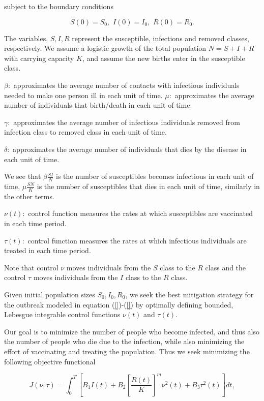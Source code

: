 subject to the boundary conditions

\begin{equation}\label{eq.1.4.4}
S(0)=S_0,\,\, I(0)=I_0,\,\, R(0)=R_0.
\end{equation}

The variables,  $S,I, R$ represent the susceptible, infections and removed 
classes, respectively. We assume a logistic growth of the total population 
$N=S+I+R$ with carrying capacity $K$, and assume the new births enter in the 
susceptible class.

$\beta :$ approximates the average number of contacts with infectious 
individuals needed to make one person ill in each unit of time.
$\mu :$ approximates the average number of individuals that birth/death in each 
unit of time.

$\gamma :$ approximates the average number of infectious individuals removed 
from infection class to removed class in each unit of time.

$\delta :$ approximates the average number of individuals that dies by the 
disease in each unit of time.

We see that $\beta \frac{SI}{N}$ is the number of susceptibles becomes 
infectious in each unit of time, $\mu \frac{SN}{K}$ is the number of 
susceptibles that dies in each unit of time, similarly in the other terms. 

$\nu (t):$ control function measures the rates at which susceptibles are 
vaccinated in each time period.

$\tau (t):$ control function measures the rates at which infectious individuals 
are treated in each time period.

Note that control $\nu$ moves individuals from the $S$ class to the $R$ class 
and the control $\tau$ moves individuals from the $I$ class to the $R$ class.

Given initial population sizes $S_0,I_0,R_0$, we seek the best mitigation 
strategy for the outbreak modeled in equation (\ref{})-(\ref{}) by optimally 
defining bounded, Lebesgue integrable control functions $\nu (t)$ and $\tau 
(t)$.

Our goal is to minimize the number of people who become infected, and thus also 
the number of people who die due to the infection, while also minimizing the 
effort of vaccinating and treating the population. Thus we seek minimizing the 
following objective functional

\begin{equation}\label{eq.1.4.5}
J(\nu,\tau)=\int_{0}^{T} [B_1 I(t)+B_2[\frac{R(t)}{K}]^m \nu^2(t)+B_3\tau^2(t)] 
dt,
\end{equation}

